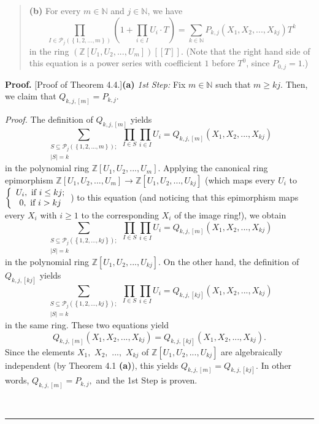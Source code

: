 \documentclass[numbers=enddot,12pt,final,onecolumn,notitlepage]{scrartcl}%
\newenvironment{proof}[1][Proof]{\noindent\textbf{#1.} }{\ \rule{0.5em}{0.5em}}
\begin{document}
\begin{quote}
\textbf{(b)} For every $m\in\mathbb{N}$ and $j\in\mathbb{N}$, we have%
\begin{equation}
\prod_{I\in\mathcal{P}_{j}\left(  \left\{  1,2,...,m\right\}  \right)
}\left(  1+\prod_{i\in I}U_{i}\cdot T\right)  =\sum_{k\in\mathbb{N}}%
P_{k,j}\left(  X_{1},X_{2},...,X_{kj}\right)  T^{k} \label{Pkj2}%
\end{equation}
in the ring $\left(  \mathbb{Z}\left[  U_{1},U_{2},...,U_{m}\right]  \right)
\left[  \left[  T\right]  \right]  $. (Note that the right hand side of this
equation is a power series with coefficient $1$ before $T^{0}$, since
$P_{0,j}=1$.)
\end{quote}

\begin{proof}
[Proof of Theorem 4.4.]\textbf{(a)} \textit{1st Step:} Fix $m\in\mathbb{N}$
such that $m\geq kj$. Then, we claim that $Q_{k,j,\left[  m\right]  }=P_{k,j}$.

\textit{Proof.} The definition of $Q_{k,j,\left[  m\right]  }$ yields
\[
\sum_{\substack{S\subseteq\mathcal{P}_{j}\left(  \left\{  1,2,...,m\right\}
\right)  ;\\\left\vert S\right\vert =k}}\prod_{I\in S}\prod_{i\in I}%
U_{i}=Q_{k,j,\left[  m\right]  }\left(  X_{1},X_{2},...,X_{kj}\right)
\]
in the polynomial ring $\mathbb{Z}\left[  U_{1},U_{2},...,U_{m}\right]  $.
Applying the canonical ring epimorphism $\mathbb{Z}\left[  U_{1}%
,U_{2},...,U_{m}\right]  \rightarrow\mathbb{Z}\left[  U_{1},U_{2}%
,...,U_{kj}\right]  $ (which maps every $U_{i}$ to $\left\{
\begin{array}
[c]{c}%
U_{i},\text{ if }i\leq kj;\\
0,\text{ if }i>kj
\end{array}
\right.  $) to this equation (and noticing that this epimorphism maps every
$X_{i}$ with $i\geq1$ to the corresponding $X_{i}$ of the image ring!), we
obtain%
\[
\sum_{\substack{S\subseteq\mathcal{P}_{j}\left(  \left\{  1,2,...,kj\right\}
\right)  ;\\\left\vert S\right\vert =k}}\prod_{I\in S}\prod_{i\in I}%
U_{i}=Q_{k,j,\left[  m\right]  }\left(  X_{1},X_{2},...,X_{kj}\right)
\]
in the polynomial ring $\mathbb{Z}\left[  U_{1},U_{2},...,U_{kj}\right]  $. On
the other hand, the definition of $Q_{k,j,\left[  kj\right]  }$ yields%
\[
\sum_{\substack{S\subseteq\mathcal{P}_{j}\left(  \left\{  1,2,...,kj\right\}
\right)  ;\\\left\vert S\right\vert =k}}\prod_{I\in S}\prod_{i\in I}%
U_{i}=Q_{k,j,\left[  kj\right]  }\left(  X_{1},X_{2},...,X_{kj}\right)
\]
in the same ring. These two equations yield%
\[
Q_{k,j,\left[  m\right]  }\left(  X_{1},X_{2},...,X_{kj}\right)
=Q_{k,j,\left[  kj\right]  }\left(  X_{1},X_{2},...,X_{kj}\right)  .
\]
Since the elements $X_{1},$ $X_{2},$ $...,$ $X_{kj}$ of $\mathbb{Z}\left[
U_{1},U_{2},...,U_{kj}\right]  $ are algebraically independent (by Theorem 4.1
\textbf{(a)}), this yields $Q_{k,j,\left[  m\right]  }=Q_{k,j,\left[
kj\right]  }.$ In other words, $Q_{k,j,\left[  m\right]  }=P_{k,j},$ and the
1st Step is proven.


\end{proof}
\end{document}
